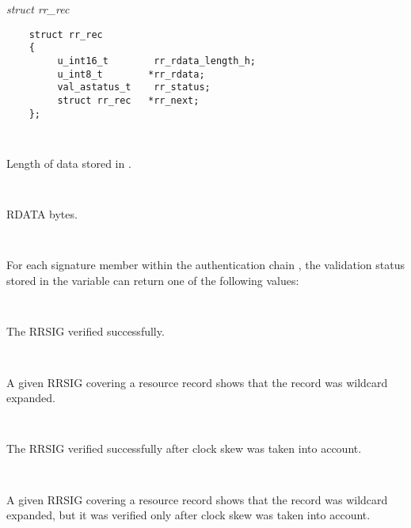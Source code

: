 \begin{description}

\item {\it struct rr\_rec}\verb" "

\begin{verbatim}
    struct rr_rec
    {
         u_int16_t        rr_rdata_length_h;
         u_int8_t        *rr_rdata;
         val_astatus_t    rr_status;
         struct rr_rec   *rr_next;
    };
\end{verbatim}

\begin{description}

\item {} \verb" "

Length of data stored in .

\item {} \verb" "

RDATA bytes.

\item {} \verb" "

For each signature  member within the authentication chain
, the validation status stored in the variable
 can return one of the following values:

\begin{description}
\item {}\verb" "

The RRSIG verified successfully.

\item {}\verb" "

A given RRSIG covering a resource record shows that
the record was wildcard expanded.

\item {}\verb" "

The RRSIG verified successfully after clock skew was
taken into account.

\item {}\verb" "

A given RRSIG covering a resource record shows that
the record was wildcard expanded, but it was verified
only after clock skew was taken into account.

\item {}\verb" "


\end{description}
\end{description}
\end{description}
